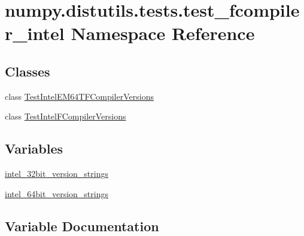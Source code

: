 \hypertarget{namespacenumpy_1_1distutils_1_1tests_1_1test__fcompiler__intel}{}\section{numpy.\+distutils.\+tests.\+test\+\_\+fcompiler\+\_\+intel Namespace Reference}
\label{namespacenumpy_1_1distutils_1_1tests_1_1test__fcompiler__intel}
\subsection*{Classes}
\begin{DoxyCompactItemize}
\item 
class \hyperlink{classnumpy_1_1distutils_1_1tests_1_1test__fcompiler__intel_1_1TestIntelEM64TFCompilerVersions}{Test\+Intel\+E\+M64\+T\+F\+Compiler\+Versions}
\item 
class \hyperlink{classnumpy_1_1distutils_1_1tests_1_1test__fcompiler__intel_1_1TestIntelFCompilerVersions}{Test\+Intel\+F\+Compiler\+Versions}
\end{DoxyCompactItemize}
\subsection*{Variables}
\begin{DoxyCompactItemize}
\item 
\hyperlink{namespacenumpy_1_1distutils_1_1tests_1_1test__fcompiler__intel_a356bbe7ed83ef21bcf014f05ee80716b}{intel\+\_\+32bit\+\_\+version\+\_\+strings}
\item 
\hyperlink{namespacenumpy_1_1distutils_1_1tests_1_1test__fcompiler__intel_a8d7876000700f0c26fe744c2815a82dd}{intel\+\_\+64bit\+\_\+version\+\_\+strings}
\end{DoxyCompactItemize}


\subsection{Variable Documentation}
\mbox{\label{namespacenumpy_1_1distutils_1_1tests_1_1test__fcompiler__intel_a356bbe7ed83ef21bcf014f05ee80716b}} 
